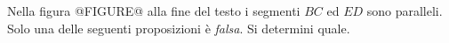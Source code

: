 Nella 
figura @FIGURE@ alla fine del testo
 i segmenti $BC$ ed $ED$ sono paralleli. Solo una 
delle seguenti proposizioni è \emph{falsa}. Si determini quale.